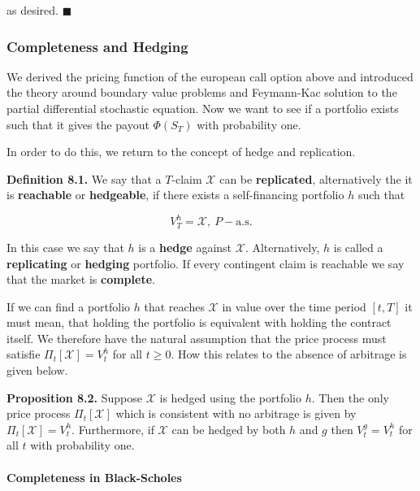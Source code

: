 \documentclass[
]{article}
\begin{document}
as desired. \(\blacksquare\)

\hypertarget{completeness-and-hedging}{%
\subsubsection{Completeness and
Hedging}\label{completeness-and-hedging}}

We derived the pricing function of the european call option above and
introduced the theory around boundary value problems and Feymann-Kac
solution to the partial differential stochastic equation. Now we want to
see if a portfolio exists such that it gives the payout \(\Phi(S_T)\)
with probability one.

In order to do this, we return to the concept of hedge and replication.

\textbf{Definition 8.1.} We say that a \(T\)-claim \(\mathcal{X}\) can
be \textbf{replicated}, alternatively the it is \textbf{reachable} or
\textbf{hedgeable}, if there exists a self-financing portfolio \(h\)
such that

\[
V_T^h=\mathcal{X},\ P-\text{a.s.}\tag{8.1}
\]

In this case we say that \(h\) is a \textbf{hedge} against
\(\mathcal{X}\). Alternatively, \(h\) is called a \textbf{replicating}
or \textbf{hedging} portfolio. If every contingent claim is reachable we
say that the market is \textbf{complete}.

If we can find a portfolio \(h\) that reaches \(\mathcal{X}\) in value
over the time period \([t,T]\) it must mean, that holding the portfolio
is equivalent with holding the contract itself. We therefore have the
natural assumption that the price process must satisfie
\(\Pi_t[\mathcal{X}]=V_t^h\) for all \(t\ge 0\). How this relates to the
absence of arbitrage is given below.

\textbf{Proposition 8.2.} Suppose \(\mathcal{X}\) is hedged using the
portfolio \(h\). Then the only price process \(\Pi_t[\mathcal{X}]\)
which is consistent with no arbitrage is given by
\(\Pi_t[\mathcal{X}]=V_t^h\). Furthermore, if \(\mathcal{X}\) can be
hedged by both \(h\) and \(g\) then \(V_t^g=V_t^h\) for all \(t\) with
probability one.

\hypertarget{completeness-in-black-scholes}{%
\paragraph{Completeness in
Black-Scholes}\label{completeness-in-black-scholes}}
\end{document}
